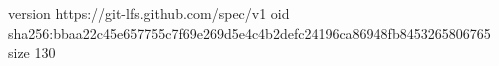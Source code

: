 version https://git-lfs.github.com/spec/v1
oid sha256:bbaa22c45e657755c7f69e269d5e4c4b2defc24196ca86948fb8453265806765
size 130
